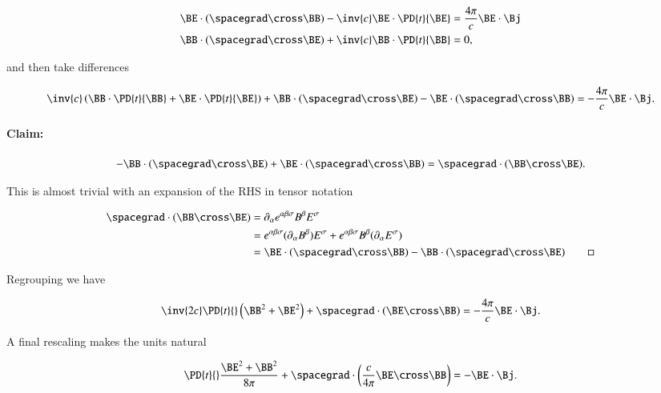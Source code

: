 \begin{align}\label{eqn:relativisticElectrodynamicsL16:550}
\BE \cdot (\spacegrad \cross \BB) -\inv{c} \BE \cdot \PD{t}{\BE} &= \frac{4 \pi}{c} \BE \cdot \Bj \\
\BB \cdot (\spacegrad \cross \BE) +\inv{c} \BB \cdot \PD{t}{\BB} &= 0,
\end{align}

and then take differences

\begin{equation}\label{eqn:relativisticElectrodynamicsL16:570}
\inv{c} \left(
\BB \cdot \PD{t}{\BB}
+ \BE \cdot \PD{t}{\BE} \right) + \BB \cdot (\spacegrad \cross \BE) -\BE \cdot (\spacegrad \cross \BB) =
-\frac{4 \pi}{c} \BE \cdot \Bj.
\end{equation}

\paragraph{Claim:}

\begin{equation}\label{eqn:relativisticElectrodynamicsL16:590}
-\BB \cdot (\spacegrad \cross \BE) +\BE \cdot (\spacegrad \cross \BB) = \spacegrad \cdot ( \BB \cross \BE ).
\end{equation}

This is almost trivial with an expansion of the RHS in tensor notation

\begin{align*}
\spacegrad \cdot ( \BB \cross \BE )
&=
\partial_\alpha e^{\alpha \beta \sigma} B^\beta E^\sigma \\
&=
e^{\alpha \beta \sigma} (\partial_\alpha B^\beta) E^\sigma
+
e^{\alpha \beta \sigma} B^\beta (\partial_\alpha E^\sigma) \\
&=
\BE \cdot (\spacegrad \cross \BB)
-\BB \cdot (\spacegrad \cross \BE)\qquad \square
\end{align*}

Regrouping we have

\begin{equation}\label{eqn:relativisticElectrodynamicsL16:610}
\inv{2 c} \PD{t}{} \left(
\BB^2 + \BE^2 \right) + \spacegrad \cdot ( \BE \cross \BB )
=
-\frac{4 \pi}{c} \BE \cdot \Bj.
\end{equation}

A final rescaling makes the units natural

\begin{equation}\label{eqn:relativisticElectrodynamicsL16:630}
\PD{t}{} \frac{ \BE^2 + \BB^2 }{8 \pi} + \spacegrad \cdot \left( \frac{c}{4 \pi} \BE \cross \BB \right) = - \BE \cdot \Bj.
\end{equation}

